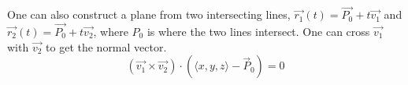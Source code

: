 \noindent
One can also construct a plane from two intersecting lines, $\vec{r_1}(t) = \vec{P_0} + t\vec{v_1}$ and $\vec{r_2}(t) = \vec{P_0} + t\vec{v_2}$, where $P_0$ is where the two lines intersect. One can cross $\vec{v_1}$ with $\vec{v_2}$ to get the normal vector.
\begin{equation*}
	\left(\vec{v_1} \times \vec{v_2}\right) \cdot \left(\langle x,y,z \rangle - \vec{P}_{0}\right) = 0
\end{equation*}